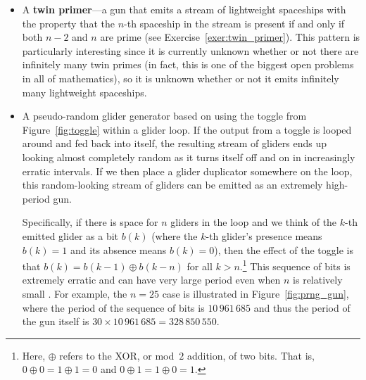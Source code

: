 \begin{itemize}
	\item A \textbf{twin primer}---a gun that emits a stream of lightweight spaceships with the property that the $n$-th spaceship in the stream is present if and only if both $n-2$ and $n$ are prime (see Exercise~\ref{exer:twin_primer}). This pattern is particularly interesting since it is currently unknown whether or not there are infinitely many twin primes (in fact, this is one of the biggest open problems in all of mathematics), so it is unknown whether or not it emits infinitely many lightweight spaceships.\smallskip
	
	\item A pseudo-random glider generator based on using the toggle from Figure~\ref{fig:toggle} within a glider loop. If the output from a toggle is looped around and fed back into itself, the resulting stream of gliders ends up looking almost completely random as it turns itself off and on in increasingly erratic intervals. If we then place a glider duplicator somewhere on the loop, this random-looking stream of gliders can be emitted as an extremely high-period gun.
	
	Specifically, if there is space for $n$ gliders in the loop and we think of the $k$-th emitted glider as a bit $b(k)$ (where the $k$-th glider's presence means $b(k) = 1$ and its absence means $b(k) = 0$), then the effect of the toggle is that $b(k) = b(k-1) \oplus b(k-n)$ for all $k > n$.\footnote{Here, $\oplus$ refers to the XOR, or mod~$2$ addition, of two bits. That is, $0 \oplus 0 = 1 \oplus 1 = 0$ and $0 \oplus 1 = 1 \oplus 0 = 1$.} This sequence of bits is extremely erratic and can have very large period even when $n$ is relatively small \cite{A046932}. For example, the $n = 25$ case is illustrated in Figure~\ref{fig:prng_gun}, where the period of the sequence of bits is $10\,961\,685$ and thus the period of the gun itself is $30 \times 10\,961\,685 = 328\,850\,550$.\smallskip
%
	

\end{itemize}
